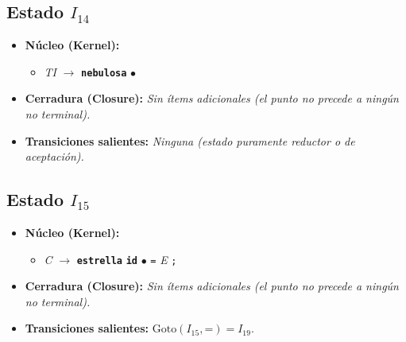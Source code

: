 \documentclass[12pt, letterpaper]{article}
\begin{document}
\subsection*{Estado $I_{14}$ }
\begin{itemize}\setlength{\itemsep}{1pt}\setlength{\parskip}{0pt}
\item \textbf{Núcleo (Kernel):}
\begin{itemize}\setlength{\itemsep}{1pt}\setlength{\parskip}{0pt}
    \item \textit{TI} $\to$ \textbf{\texttt{nebulosa}} $\bullet$ 
\end{itemize}
\item \textbf{Cerradura (Closure):} \emph{Sin ítems adicionales (el punto no precede a ningún no terminal).}
\item \textbf{Transiciones salientes:} \emph{Ninguna (estado puramente reductor o de aceptación).}
\end{itemize}
\vspace{2pt}
\subsection*{Estado $I_{15}$ }
\begin{itemize}\setlength{\itemsep}{1pt}\setlength{\parskip}{0pt}
\item \textbf{Núcleo (Kernel):}
\begin{itemize}\setlength{\itemsep}{1pt}\setlength{\parskip}{0pt}
    \item \textit{C} $\to$ \textbf{\texttt{estrella}} \textbf{\texttt{id}} $\bullet$ \texttt{=} \textit{E} \texttt{;}
\end{itemize}
\item \textbf{Cerradura (Closure):} \emph{Sin ítems adicionales (el punto no precede a ningún no terminal).}
\item \textbf{Transiciones salientes:} $\text{Goto}(I_{15}, \texttt{=}) = I_{19}$.
\end{itemize}
\vspace{2pt}
\end{document}
